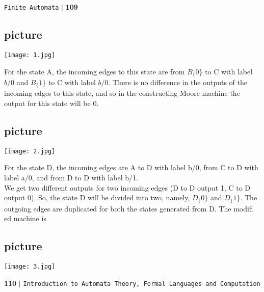 \documentclass{article}
\begin{document}
\begin{flushright}
 \texttt{Finite Automata} \hspace*{0.10cm}\textbf{$|$} \textbf{109}\hspace*{0.5cm}
\end{flushright}

\begin{center}
\section{picture}
\texttt{[image: 1.jpg]}
\end{center}
For the state A, the incoming edges to this state are from $B_\{0\}$ to C with label $b/0$ and $B_\{1\}$ to C with label $b/0$. There is no difference in the outputs of the incoming edges to this state, and so in the constructing Moore machine the output for this state will be 0.\\

\begin{center}
\section{picture}
\texttt{[image: 2.jpg]}
\end{center}

For the state D, the incoming edges are A to D with label b/0, from C to D with label a/0, and from D to D with label b/1.\\
We get two different outputs for two incoming edges (D to D output 1, C to D output 0). So, the state D will be divided into two, namely, $D_\{0\}$ and $D_\{1\}$. The outgoing edges are duplicated for both the states generated from D. The modiﬁ ed machine is
\begin{center}
\section{picture}
\texttt{[image: 3.jpg]}
\end{center}

\newpage
\begin{flushleft}
    \textbf{110}\hspace*{0.1cm} \textbf{$|$} \hspace*{0.1cm} \texttt{Introduction to Automata Theory, Formal Languages and Computation}
  \end{flushleft}
\end{document}
